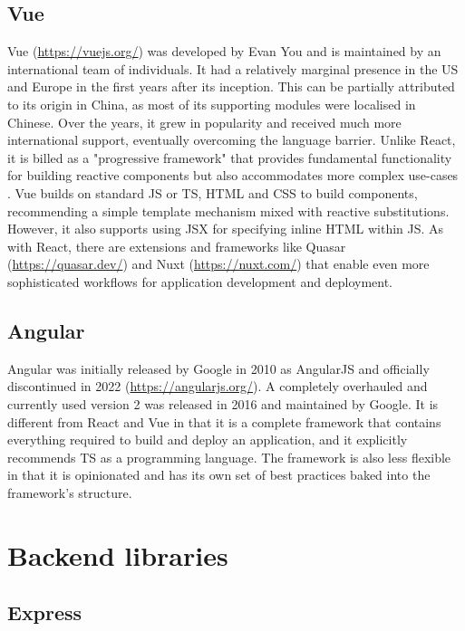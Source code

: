 \subsection{Vue}

Vue (\url{https://vuejs.org/}) was developed by Evan You and is maintained by an international team of individuals. It had a relatively marginal presence in the US and Europe in the first years after its inception. This can be partially attributed to its origin in China, as most of its supporting modules were localised in Chinese. Over the years, it grew in popularity and received much more international support, eventually overcoming the language barrier. Unlike React, it is billed as a "progressive framework" that provides fundamental functionality for building reactive components but also accommodates more complex use-cases \parencite{vueProgressiveFramework}. Vue builds on standard \ac{JS} or \ac{TS}, \ac{HTML} and \ac{CSS} to build components, recommending a simple template mechanism mixed with reactive substitutions. However, it also supports using \ac{JSX} for specifying inline \ac{HTML} within \ac{JS}. As with React, there are extensions and frameworks like Quasar (\url{https://quasar.dev/}) and Nuxt (\url{https://nuxt.com/}) that enable even more sophisticated workflows for application development and deployment.

\subsection{Angular}

Angular was initially released by Google in 2010 as AngularJS and officially discontinued in 2022 (\url{https://angularjs.org/}). A completely overhauled and currently used version 2 was released in 2016 and maintained by Google. It is different from React and Vue in that it is a complete framework that contains everything required to build and deploy an application, and it explicitly recommends \ac{TS} as a programming language. The framework is also less flexible in that it is opinionated and has its own set of best practices baked into the framework's structure.




\section{Backend libraries}

\subsection{Express}

